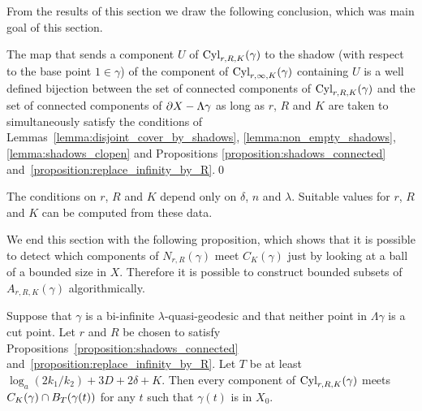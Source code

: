 From the results of this section we draw the following conclusion, which was main goal of this section.

\begin{proposition}\label{proposition:summary_of_cylinder_results} 
  The map that sends a component $U$ of $\operatorname{Cyl}_{r, R, K}(\gamma)$ to the shadow (with respect to the base point $1 \in \gamma$) of the component of $\operatorname{Cyl}_{r, \infty, K}(\gamma)$ containing $U$ is a well defined bijection between the set of connected components of $\operatorname{Cyl}_{r, R, K}(\gamma)$ and the set of connected components of $\partial X - \Lambda\gamma$ as long as $r$, $R$ and $K$ are taken to simultaneously satisfy the conditions of Lemmas~\ref{lemma:disjoint_cover_by_shadows}, \ref{lemma:non_empty_shadows}, \ref{lemma:shadows_clopen} and Propositions \ref{proposition:shadows_connected} and~\ref{proposition:replace_infinity_by_R}.\qed\end{proposition}

\begin{remark}\label{rem:rKRcomputable} 
  The conditions on $r$, $R$ and $K$ depend only on $\delta$, $n$ and $\lambda$. 
  Suitable values for $r$, $R$ and $K$ can be computed from these data.
\end{remark}

We end this section with the following proposition, which shows that it is possible to detect which components of $N_{r, R}(\gamma)$ meet $C_K(\gamma)$ just by looking at a ball of a bounded size in $X$.
Therefore it is possible to construct bounded subsets of $A_{r, R, K}(\gamma)$ algorithmically.

\begin{proposition}\label{proposition:cylinder_disconnected_locally} 
  Suppose that $\gamma$ is a bi-infinite $\lambda$-quasi-geodesic and that neither point in $\Lambda\gamma$ is a cut point. 
  Let $r$ and $R$ be chosen to satisfy Propositions~\ref{proposition:shadows_connected} and~\ref{proposition:replace_infinity_by_R}. 
  Let $T$ be at least $\log_a(2k_1/k_2) + 3D + 2\delta + K$. 
  Then every component of\/ $\operatorname{Cyl}_{r, R, K}(\gamma)$ meets $C_K(\gamma) \cap B_{T}(\gamma(t))$ for any $t$ such that $\gamma(t)$ is in $X_0$.  
\end{proposition}

